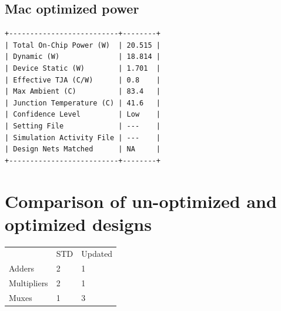 \documentclass[11pt]{report}
\begin{document}
\subsection*{Mac optimized power}
\begin{lstlisting}
+--------------------------+--------+
| Total On-Chip Power (W)  | 20.515 |
| Dynamic (W)              | 18.814 |
| Device Static (W)        | 1.701  |
| Effective TJA (C/W)      | 0.8    |
| Max Ambient (C)          | 83.4   |
| Junction Temperature (C) | 41.6   |
| Confidence Level         | Low    |
| Setting File             | ---    |
| Simulation Activity File | ---    |
| Design Nets Matched      | NA     |
+--------------------------+--------+
\end{lstlisting}
\newpage









\normalsize
\section*{Comparison of un-optimized and optimized designs}

\begin{tabular}{lll}
	 & STD & Updated\\
	Adders & 2 & 1\\
	Multipliers & 2 & 1\\
	Muxes & 1 & 3\\
\end{tabular}
\end{document}
